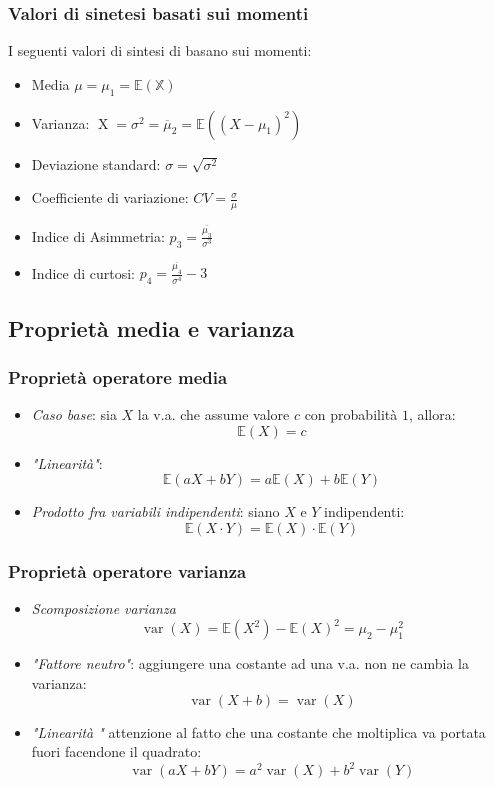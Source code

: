 \subsubsection*{Valori di sinetesi basati sui momenti}
I seguenti valori di sintesi di basano sui momenti:
\begin{itemize}
	\item  Media $ \mu  = \mu  _1 = \mathbb{E \left(X\right)} $
	\item Varianza: $ \operatorname{X} = \sigma ^2 = \overline{\mu}_2 = \mathbb{E}\left(\left(X - \mu_1\right)^2 \right) $
	\item Deviazione standard: $ \sigma = \sqrt{\sigma ^2 }$
	\item Coefficiente di variazione: $ CV = \frac{\sigma}{\mu } $
	\item Indice di Asimmetria: $ p_3 = \displaystyle\frac{\overline{\mu_3}}{\sigma ^{3}} $
	\item Indice di curtosi: $  p_4 = \displaystyle\frac{\overline{\mu_4}}{\sigma ^{4}}-3 $
\end{itemize}
\subsection{Proprietà media e varianza}
\subsubsection*{Proprietà operatore media}
\begin{itemize}
	\item \textit{Caso base}: sia $ X $ la v.a. che assume valore $ c $  con probabilità $ 1 $, allora:
	      \[
		      \mathbb{E}\left(X\right) = c
	      \]
	\item \textit{"Linearità"}:
	      \[
		      \mathbb{E}\left(a X + b Y\right) = a\mathbb{E}\left(X\right) + b \mathbb{E}\left(Y\right)
	      \]
	\item \textit{Prodotto fra variabili indipendenti}: siano $ X $ e $ Y $ indipendenti:
	      \[
		      \mathbb{E}\left(X \cdot Y\right)= \mathbb{E}\left(X\right)\cdot \mathbb{E}\left(Y\right)
	      \]
\end{itemize}
\subsubsection*{Proprietà operatore varianza}
\begin{itemize}
	\item \textit{Scomposizione varianza}
	      \[
		      \operatorname{var}\left(X \right) = \mathbb{E} \left(X^2 \right) - \mathbb{E}\left(X\right)^2 = \mu _2 - \mu _1^2
	      \]
	\item \textit{"Fattore neutro"}: aggiungere una costante ad una v.a. non ne cambia la varianza:
	      \[
		      \operatorname{var}\left(X + b\right) = \operatorname{var}\left(X\right)
	      \]
	\item \textit{"Linearità "} attenzione al fatto che una costante che moltiplica va portata fuori facendone il quadrato:
	      \[
		      \operatorname{var} \left(aX + bY\right) = a^2  \operatorname{var}\left(X\right) + b^2  \operatorname{var}\left(Y\right)
	      \]
\end{itemize}
